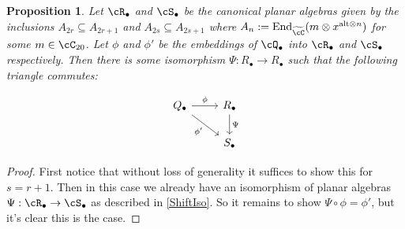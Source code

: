 \documentclass[11pt]{article}
\theoremstyle{plain}
\newtheorem{prop}[thm]{Proposition}
\theoremstyle{definition}
\DeclareMathOperator{\End}{End}
\newcommand{\alttens}[1][n]{{\text{alt}\otimes #1}}
\newcommand{\xalt}{x^{\alttens}}
\begin{document}
\begin{prop}
Let $\cR_{\bullet}$ and $\cS_{\bullet}$ be the canonical planar algebras given by the inclusions $A_{2r}\subseteq A_{2r+1}$ and $A_{2s}\subseteq A_{2s+1}$ where $A_n:=\End_{\widetilde{\cC}}(m\otimes \xalt)$ for some $m\in \cC_{20}$. Let $\phi$ and $\phi'$ be the embeddings of $\cQ_{\bullet}$ into $\cR_{\bullet}$ and $\cS_{\bullet}$ respectively. Then there is some isomorphism $\Psi:R_{\bullet}\rightarrow R_{\bullet}$ such that the following triangle commutes:

$$
  \begin{tikzcd}
    Q_{\bullet} \arrow{r}{\phi} \arrow[swap]{dr}{\phi'} & R_{\bullet} \arrow{d}{\Psi} \\
     & S_{\bullet}
  \end{tikzcd}
$$  
\end{prop}

\begin{proof}
First notice that without loss of generality it suffices to show this for $s=r+1$. Then in this case we already have an isomorphism of planar algebras $\Psi:\cR_{\bullet}\rightarrow \cS_{\bullet}$ as described in \ref{ShiftIso}. So it remains to show $\Psi\circ \phi=\phi'$, but it's clear this is the case.
\end{proof}


{\footnotesize{

}}
\end{document}
